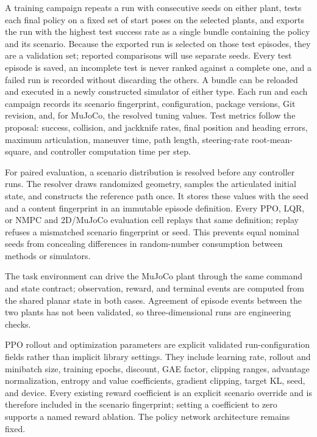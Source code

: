 A training campaign repeats a run with consecutive seeds on either plant,
tests each final policy on a fixed set of start poses on the selected plants,
and exports the run with the highest test success rate as a single bundle
containing the policy and its scenario. Because the exported run is selected
on those test episodes, they are a validation set; reported comparisons will
use separate seeds. Every test episode is saved, an incomplete test is never
ranked against a complete one, and a failed run is recorded without
discarding the others. A bundle can be reloaded and executed
in a newly constructed simulator of either type. Each run and each campaign
records its scenario fingerprint, configuration, package versions, Git
revision, and, for MuJoCo, the resolved tuning values. Test metrics follow the
proposal: success, collision, and jackknife rates, final position and heading
errors, maximum articulation, maneuver time, path length, steering-rate
root-mean-square, and controller computation time per step.

For paired evaluation, a scenario distribution is resolved before any
controller runs. The resolver draws randomized geometry, samples the
articulated initial state, and constructs the reference path once. It stores
these values with the seed and a content fingerprint in an immutable episode
definition. Every PPO, LQR, or NMPC and 2D/MuJoCo evaluation cell replays that
same definition; replay refuses a mismatched scenario fingerprint or seed.
This prevents equal nominal seeds from concealing differences in random-number
consumption between methods or simulators.

The task environment can drive the MuJoCo plant through the same command and
state contract; observation, reward, and terminal events are computed from the
shared planar state in both cases. Agreement of episode events between the two
plants has not been validated, so three-dimensional runs are engineering
checks.

\implemented{} PPO rollout and optimization parameters are explicit validated
run-configuration fields rather than implicit library settings. They include
learning rate, rollout and minibatch size, training epochs, discount, GAE
factor, clipping ranges, advantage normalization, entropy and value
coefficients, gradient clipping, target KL, seed, and device. Every existing
reward coefficient is an explicit scenario override and is therefore included
in the scenario fingerprint; setting a coefficient to zero supports a named
reward ablation. The policy network architecture remains fixed.

